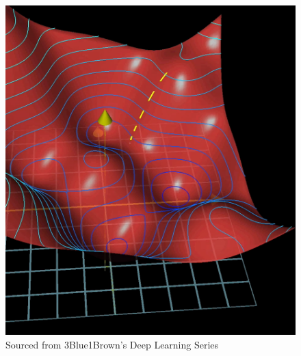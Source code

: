 \begin{flushleft}
                    \begin{figure}[H]
                        \centering 
                        \includegraphics[width=14cm]{Images/ModellingOfProblem/GradientDescent.png}
                        \caption*{Sourced from 3Blue1Brown's Deep Learning Series}
                    \end{figure}


\end{flushleft}
